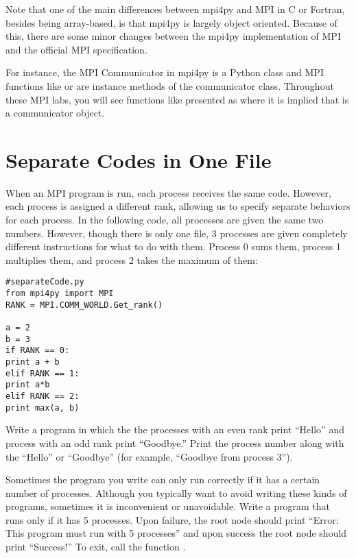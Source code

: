 Note that one of the main differences between mpi4py and MPI in C or Fortran, 
besides being array-based, is that mpi4py is largely object oriented. 
Because of this, there are some minor changes between the mpi4py implementation of 
MPI and the official MPI specification.

For instance, the MPI Communicator in mpi4py is a Python class and MPI functions 
like  or  are instance methods of the communicator class. 
Throughout these MPI labs, you will see functions like  presented as 
 where it is implied that  is a communicator object.

\section*{Separate Codes in One File}
When an MPI program is run, each process receives the same code. 
However, each process is assigned a different rank, allowing us to specify separate 
behaviors for each process. In the following code, all processes are given the same two numbers. 
However, though there is only one file, 3 processes are given completely different instructions 
for what to do with them. Process 0 sums them, process 1 multiplies them, 
and process 2 takes the maximum of them:
\begin{lstlisting}
#separateCode.py
from mpi4py import MPI
RANK = MPI.COMM_WORLD.Get_rank()

a = 2
b = 3
if RANK == 0:
print a + b
elif RANK == 1:
print a*b
elif RANK == 2:
print max(a, b)
\end{lstlisting}

\begin{problem}
Write a program in which the the processes with an even rank print ``Hello'' and 
process with an odd rank print ``Goodbye.'' 
Print the process number along with the ``Hello'' or ``Goodbye'' 
(for example, ``Goodbye from process 3'').
\end{problem}

\begin{problem}
Sometimes the program you write can only run correctly if it has a certain number of processes. 
Although you typically want to avoid writing these kinds of programs, sometimes it is 
inconvenient or unavoidable. Write a program that runs only if it has 5 processes. 
Upon failure, the root node should print ``Error: This program must run with 5 processes'' 
and upon success the root node should print ``Success!'' To exit, call the function 
.
\end{problem}
